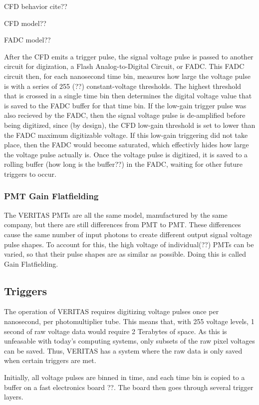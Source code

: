CFD behavior cite??

CFD model??

FADC model??

After the CFD emits a trigger pulse, the signal voltage pulse is passed to another circuit for digization, a Flash Analog-to-Digital Circuit, or FADC.
This FADC circuit then, for each nanosecond time bin, measures how large the voltage pulse is with a series of 255 (??) constant-voltage thresholds.
The highest threshold that is crossed in a single time bin then determines the digital voltage value that is saved to the FADC buffer for that time bin.
If the low-gain trigger pulse was also recieved by the FADC, then the signal voltage pulse is de-amplified before being digitized, since (by design), the CFD low-gain threshold is set to lower than the FADC maximum digitizable voltage.
If this low-gain triggering did not take place, then the FADC would become saturated, which effectivly hides how large the voltage pulse actually is.
Once the voltage pulse is digitized, it is saved to a rolling buffer (how long is the buffer??) in the FADC, waiting for other future triggers to occur.

\subsubsection{PMT Gain Flatfielding}

The VERITAS PMTs are all the same model, manufactured by the same company, but there are still differences from PMT to PMT.
These differences cause the same number of input photons to create different output signal voltage pulse shapes.
To account for this, the high voltage of individual(??) PMTs can be varied, so that their pulse shapes are as similar as possible.
Doing this is called Gain Flatfielding.

\subsection{Triggers}\label{sec:trig}

The operation of VERITAS requires digitizing voltage pulses once per nanosecond, per photomultiplier tube.
This means that, with 255 voltage levels, 1 second of raw voltage data would require 2 Terabytes of space.
As this is unfeasable with today's computing systems, only subsets of the raw pixel voltages can be saved.
Thus, VERITAS has a system where the raw data is only saved when certain triggers are met.

Initially, all voltage pulses are binned in time, and each time bin is copied to a buffer on a fast electronics board ??.
The board then goes through several trigger layers.

